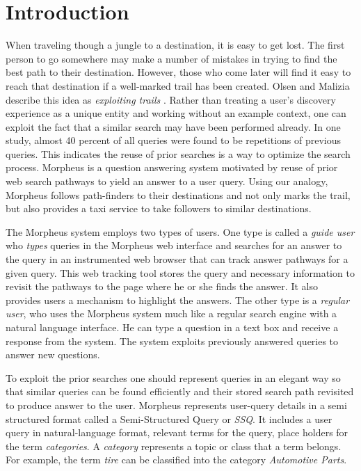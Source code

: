 \section{Introduction}



When traveling though a jungle to a destination, it is easy to get
lost.  The first person to go somewhere may make a number of mistakes
in trying to find the best path to their destination.  However, those
who come later will find it easy to reach that destination if a
well-marked trail has been created. Olsen and Malizia describe this
idea as \emph{exploiting trails} \cite{5379671}.  Rather than treating
a user's discovery experience as a unique entity and working without an example
context, one can exploit the fact that a similar search may have been
performed already.  In one study, almost 40 percent of all queries
were found to be repetitions of previous queries\cite{1277770}. This
indicates the reuse of prior searches is a way to optimize the search
process.  Morpheus is a question answering system motivated by reuse of prior web search pathways to yield an answer to a user query. Using our analogy, Morpheus follows path-finders to their destinations and not only marks the trail, but also provides a taxi service to take followers to similar destinations.

The Morpheus system employs two types of users. One type is called a
\textit{guide user} who \textit{types} queries in the Morpheus web interface and
searches for an answer to the query in an instrumented web browser that can
track answer pathways for a given query. This web tracking tool stores the query
and necessary information to revisit the pathways to the page where he or she
finds the answer. It also provides users a mechanism to highlight the answers.
The other type is a \textit{regular user}, who uses the Morpheus system much
like a regular search engine with a natural language interface. He can type a
question in a text box and receive a response from the system. The system
exploits previously answered queries to answer new questions.

To exploit the prior searches one should represent queries in an elegant way so
that similar queries can be found efficiently and their stored search path
revisited to produce answer to the user. Morpheus represents user-query details in a semi structured format called a Semi-Structured Query or \textit{SSQ}. It includes a user query in natural-language format, relevant terms for the query, place holders for the term \textit{categories}. A \textit{category} represents a topic or class that a term belongs. For example, the term \textit{tire} can be classified into the category \textit{Automotive Parts}.

